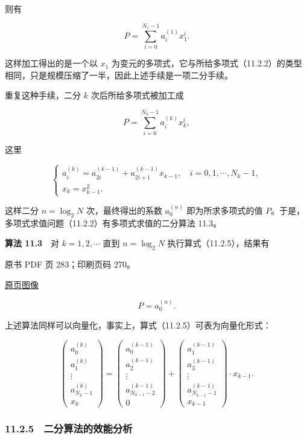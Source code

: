 则有

\[
P=\sum_{i=0}^{N_1-1}a_i^{(1)}x_1^i.
\]

这样加工得出的是一个以 \(x_1\) 为变元的多项式，它与所给多项式（11.2.2）的类型相同，只是规模压缩了一半，因此上述手续是一项二分手续。

重复这种手续，二分 \(k\) 次后所给多项式被加工成

\[
P=\sum_{i=0}^{N_k-1}a_i^{(k)}x_k^i,
\]

这里

\[
\begin{cases}
a_i^{(k)}=a_{2i}^{(k-1)}+a_{2i+1}^{(k-1)}x_{k-1},\quad i=0,1,\cdots,N_k-1,\\
x_k=x_{k-1}^2.
\end{cases}
\tag{11.2.5}
\]

这样二分 \(n=\log_2 N\) 次，最终得出的系数 \(a_0^{(n)}\) 即为所求多项式的值 \(P\)。于是，多项式求值问题（11.2.2）有多项式求值的二分算法 11.3。

\textbf{算法 11.3}　对 \(k=1,2,\cdots\) 直到 \(n=\log_2 N\) 执行算式（11.2.5），结果有

\clearpage

原书 PDF 页 283；印刷页码 270。

\href{source-images/pdf-283.jpeg}{原页图像}

\[
P=a_0^{(n)}.
\]

上述算法同样可以向量化，事实上，算式（11.2.5）可表为向量化形式：

\[
\begin{pmatrix}
a_0^{(k)}\\
a_1^{(k)}\\
\vdots\\
a_{N_k-1}^{(k)}\\
x_k
\end{pmatrix}
=
\begin{pmatrix}
a_0^{(k-1)}\\
a_2^{(k-1)}\\
\vdots\\
a_{N_{k-1}-2}^{(k-1)}\\
0
\end{pmatrix}
+
\begin{pmatrix}
a_1^{(k-1)}\\
a_3^{(k-1)}\\
\vdots\\
a_{N_{k-1}-1}^{(k-1)}\\
x_{k-1}
\end{pmatrix}\cdot x_{k-1}.
\]

\subsubsection{11.2.5　二分算法的效能分析}\label{ch11-ux4e8cux5206ux7b97ux6cd5ux7684ux6548ux80fdux5206ux6790}


